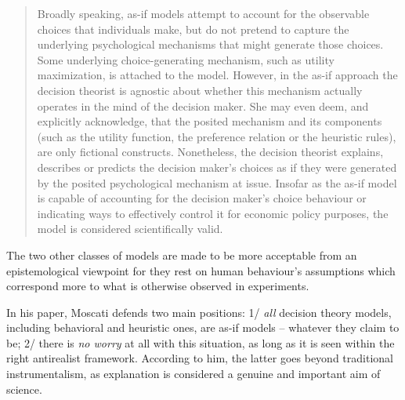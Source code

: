 \documentclass[a4paper,11pt]{article}
\theoremstyle{definition}
\begin{document}
\begin{quote}
    Broadly speaking, as-if models attempt to account for the observable choices that individuals make, but do not pretend to capture the underlying psychological mechanisms that might generate those choices. Some underlying choice-generating mechanism, such as utility maximization, is attached to the model. However, in the as-if approach the decision theorist is agnostic about whether this mechanism actually operates in the mind of the decision maker. She may even deem, and explicitly acknowledge, that the posited mechanism and its components (such as the utility function, the preference relation or the heuristic rules), are only fictional constructs. Nonetheless, the decision theorist explains, describes or predicts the decision maker’s choices as if they were generated by the posited psychological mechanism at issue. Insofar as the as-if model is capable of accounting for the decision maker’s choice behaviour or indicating ways to effectively control it for economic policy purposes, the model is considered scientifically valid.
\end{quote}

The two other classes of models are made to be more acceptable from an epistemological viewpoint for they rest on human behaviour's assumptions which correspond more to what is otherwise observed in experiments.

In his paper, Moscati defends two main positions: 1/ \textit{all} decision theory models, including behavioral and heuristic ones, are as-if models -- whatever they claim to be; 2/ there is \textit{no worry} at all with this situation, as long as it is seen within the right antirealist framework. According to him, the latter goes beyond traditional instrumentalism, as explanation is considered a genuine and important aim of science. %
\end{document}
